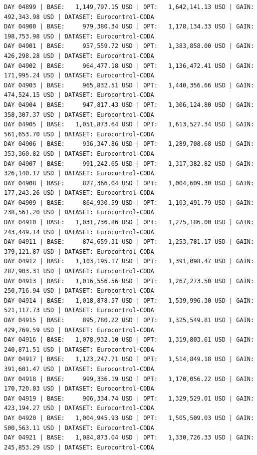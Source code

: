 \documentclass[11pt,a4paper]{article}
\begin{document}
\begin{verbatim}
DAY 04899 | BASE:   1,149,797.15 USD | OPT:   1,642,141.13 USD | GAIN: 492,343.98 USD | DATASET: Eurocontrol-CODA
DAY 04900 | BASE:     979,380.34 USD | OPT:   1,178,134.33 USD | GAIN: 198,753.98 USD | DATASET: Eurocontrol-CODA
DAY 04901 | BASE:     957,559.72 USD | OPT:   1,383,858.00 USD | GAIN: 426,298.28 USD | DATASET: Eurocontrol-CODA
DAY 04902 | BASE:     964,477.18 USD | OPT:   1,136,472.41 USD | GAIN: 171,995.24 USD | DATASET: Eurocontrol-CODA
DAY 04903 | BASE:     965,832.51 USD | OPT:   1,440,356.66 USD | GAIN: 474,524.15 USD | DATASET: Eurocontrol-CODA
DAY 04904 | BASE:     947,817.43 USD | OPT:   1,306,124.80 USD | GAIN: 358,307.37 USD | DATASET: Eurocontrol-CODA
DAY 04905 | BASE:   1,051,873.64 USD | OPT:   1,613,527.34 USD | GAIN: 561,653.70 USD | DATASET: Eurocontrol-CODA
DAY 04906 | BASE:     936,347.86 USD | OPT:   1,289,708.68 USD | GAIN: 353,360.82 USD | DATASET: Eurocontrol-CODA
DAY 04907 | BASE:     991,242.65 USD | OPT:   1,317,382.82 USD | GAIN: 326,140.17 USD | DATASET: Eurocontrol-CODA
DAY 04908 | BASE:     827,366.04 USD | OPT:   1,004,609.30 USD | GAIN: 177,243.26 USD | DATASET: Eurocontrol-CODA
DAY 04909 | BASE:     864,930.59 USD | OPT:   1,103,491.79 USD | GAIN: 238,561.20 USD | DATASET: Eurocontrol-CODA
DAY 04910 | BASE:   1,031,736.86 USD | OPT:   1,275,186.00 USD | GAIN: 243,449.14 USD | DATASET: Eurocontrol-CODA
DAY 04911 | BASE:     874,659.31 USD | OPT:   1,253,781.17 USD | GAIN: 379,121.87 USD | DATASET: Eurocontrol-CODA
DAY 04912 | BASE:   1,103,195.17 USD | OPT:   1,391,098.47 USD | GAIN: 287,903.31 USD | DATASET: Eurocontrol-CODA
DAY 04913 | BASE:   1,016,556.56 USD | OPT:   1,267,273.50 USD | GAIN: 250,716.94 USD | DATASET: Eurocontrol-CODA
DAY 04914 | BASE:   1,018,878.57 USD | OPT:   1,539,996.30 USD | GAIN: 521,117.73 USD | DATASET: Eurocontrol-CODA
DAY 04915 | BASE:     895,780.22 USD | OPT:   1,325,549.81 USD | GAIN: 429,769.59 USD | DATASET: Eurocontrol-CODA
DAY 04916 | BASE:   1,078,932.10 USD | OPT:   1,319,803.61 USD | GAIN: 240,871.51 USD | DATASET: Eurocontrol-CODA
DAY 04917 | BASE:   1,123,247.71 USD | OPT:   1,514,849.18 USD | GAIN: 391,601.47 USD | DATASET: Eurocontrol-CODA
DAY 04918 | BASE:     999,336.19 USD | OPT:   1,170,056.22 USD | GAIN: 170,720.03 USD | DATASET: Eurocontrol-CODA
DAY 04919 | BASE:     906,334.74 USD | OPT:   1,329,529.01 USD | GAIN: 423,194.27 USD | DATASET: Eurocontrol-CODA
DAY 04920 | BASE:   1,004,945.93 USD | OPT:   1,505,509.03 USD | GAIN: 500,563.11 USD | DATASET: Eurocontrol-CODA
DAY 04921 | BASE:   1,084,873.04 USD | OPT:   1,330,726.33 USD | GAIN: 245,853.29 USD | DATASET: Eurocontrol-CODA

\end{verbatim}
\end{document}
